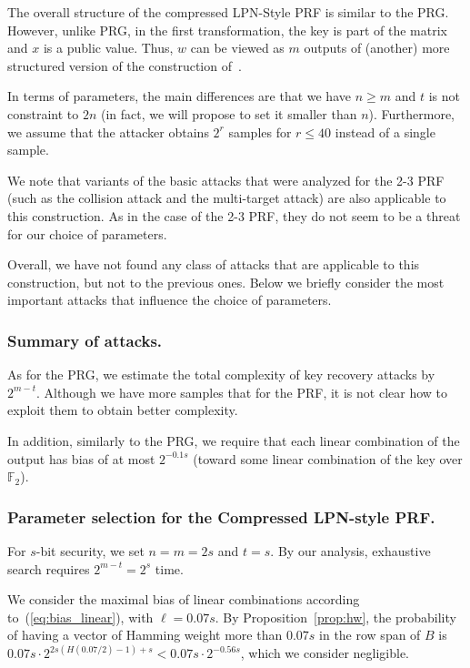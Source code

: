 \documentclass[orivec,envcountsect]{llncs}
\begin{document}
The overall structure of the compressed LPN-Style PRF is similar to the PRG.
However, unlike PRG, in the first transformation, the key is part of the matrix and
$x$ is a public value.
Thus, $w$ can be viewed as $m$ outputs of (another) more
structured version of the construction of~\cite{BonehIPSW18}.

In terms of parameters, the main differences are that we have $n \geq m$
and $t$ is not constraint to $2n$ (in fact, we will propose to set it smaller than $n$).
Furthermore, we assume that the attacker obtains $2^r$ samples for $r \leq 40$ instead of a single sample.

We note that variants of the basic attacks that were analyzed for the 2-3 PRF (such as the collision attack
and the multi-target attack) are also applicable to this construction. 
As in the case of the 2-3 PRF, 
they do not seem to be a threat for our choice of parameters.

Overall, we have not found any class of attacks that are 
applicable to this construction, but not to the previous ones.
Below we briefly consider the most important attacks that influence the 
choice of parameters.

\subsubsection{Summary of attacks.}
As for the PRG, we estimate the total complexity of key recovery attacks by $2^{m - t}$.
Although we have more samples that for the PRF, 
it is not clear how to exploit them to obtain better complexity.

In addition, similarly to the PRG,
we require that each linear combination of the output 
has bias of at most $2^{-0.1 s}$
(toward some linear combination of the key over $\mathbb{F}_2$).

\subsubsection{Parameter selection for the Compressed LPN-style PRF.}
For $s$-bit security, we set $n=m= 2s$ and $t =s$.
By our analysis, exhaustive search requires $2^{m - t} = 2^s$ time.

We consider the maximal bias of linear combinations according to~(\ref{eq:bias_linear}),
with $\ell = 0.07 s$.
By Proposition~\ref{prop:hw},
the probability of having a vector of Hamming weight more than $0.07 s$
in the row span of $B$ is
$0.07 s \cdot 2^{2s (H(0.07/2) - 1) + s} < 0.07 s \cdot 2^{-0.56 s}$,
which we consider negligible.
\end{document}
